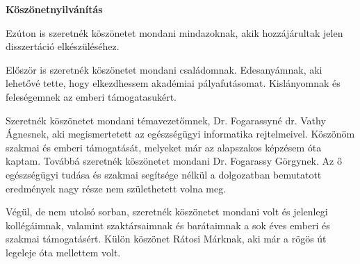 \vspace{3cm}

\centerline{\Large{\textbf{Köszönetnyilvánítás}}}

\vspace{2.5cm}

Ezúton is szeretnék köszönetet mondani mindazoknak, akik hozzájárultak jelen disszertáció elkészüléséhez.

Először is szeretnék köszönetet mondani családomnak. Edesanyámnak, aki lehetővé tette, hogy elkezdhessem akadémiai pályafutásomat. Kislányomnak és feleségemnek az emberi támogatasukért.

Szeretnék köszönetet mondani témavezetőmnek, Dr. Fogarassyné dr. Vathy Ágnesnek, aki megismertetett az egészségügyi informatika rejtelmeivel. Köszönöm szakmai és emberi támogatását, melyeket már az alapszakos képzésem óta kaptam. Továbbá szeretnék köszönetet mondani Dr. Fogarassy Görgynek. Az ő egészségügyi tudása és szakmai segítsége nélkül a dolgozatban bemutatott eredmények nagy része nem születhetett volna meg.

Végül, de nem utolsó sorban, szeretnék köszönetet mondani volt és jelenlegi kollégáimnak, valamint szaktársaimnak és barátaimnak a sok éves emberi és szakmai támogatásért. Külön köszönet Rátosi Márknak, aki már a rögös út legeleje óta mellettem volt.
